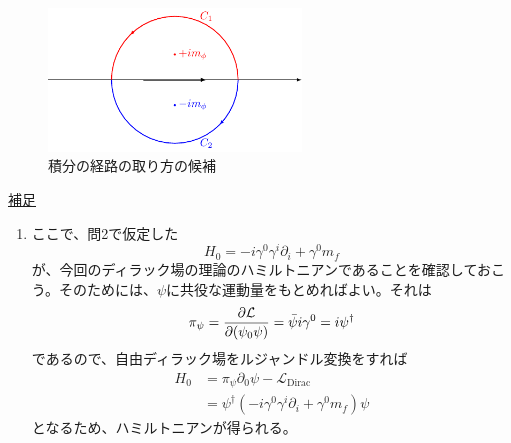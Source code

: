 \documentclass[unicode,a4paper,10pt]{ltjsarticle}
\begin{document}
\begin{enumerate}
        \begin{figure}[ht]
          \centering
          \includegraphics[width=0.6\textwidth]{fig/fig02.pdf}
          \caption{積分の経路の取り方の候補}
          \label{fig:contour}
        \end{figure}

\end{enumerate}


\uline{補足}
\begin{enumerate}
  \item
        ここで、問2で仮定した
        \begin{equation}
          H_{0}
          =
          -i\gamma^{0}\gamma^{i}\partial_{i}+\gamma^{0}m_{f}
        \end{equation}
        が、今回のディラック場の理論のハミルトニアンであることを確認しておこう。そのためには、$\psi$に共役な運動量をもとめればよい。それは
        \begin{equation}
          \pi_{\psi}
          =
          \pdv{\mathcal{L}}{(\psi_{0}\psi)}
          =
          \bar{\psi}i\gamma^{0}
          =
          i\psi^{\dag}
        \end{equation}
        であるので、自由ディラック場をルジャンドル変換をすれば
        \begin{align}
          H_{0}
           & =
          \pi_{\psi}\partial_{0}\psi
          -
          \mathcal{L}_{\textrm{Dirac}}
          \nonumber
          \\
           & =
          \psi^{\dag}(-i\gamma^{0}\gamma^{i}\partial_{i}+\gamma^{0}m_{f})\psi
        \end{align}
        となるため、ハミルトニアンが得られる。

\end{enumerate}

% 
% 
\end{document}
